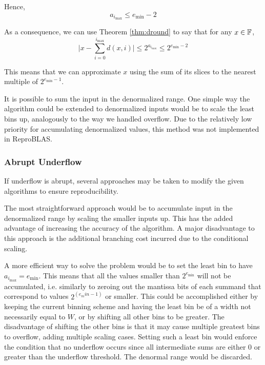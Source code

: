       Hence,
      \[
        a_{i_{\max}} \leq e_{\min} - 2
      \]

      As a consequence, we can use Theorem \ref{thm:dround} to say that for any $x \in \mathbb{F}$,
      \begin{equation}
        \bigl|x - \sum\limits_{i = 0}^{i_{\max}} d(x, i)\bigr| \leq 2^{a_{i_{\max}}} \leq 2^{e_{\min} - 2}
        \label{eq:droundunderflow}
      \end{equation}

      This means that we can approximate $x$ using the sum of its slices to the
      nearest multiple of $2^{e_{\min}-1}$.

      It is possible to sum the input in the denormalized range. One simple way
      the algorithm could be extended to denormalized inputs would be to scale
      the least bins up, analogously to the way we handled overflow. Due to the
      relatively low priority for accumulating denormalized values, this method
      was not implemented in ReproBLAS.

    \subsubsection{Abrupt Underflow}
      \label{sec:indexed_underflow_abrupt}
      If underflow is abrupt, several approaches may be taken to modify the
      given algorithms to ensure reproducibility.

      The most straightforward approach would be to accumulate input in the
      denormalized range by scaling the smaller inputs up. This has the added
      advantage of increasing the accuracy of the algorithm. A major
      disadvantage to this approach is the additional branching cost incurred
      due to the conditional scaling.

      A more efficient way to solve the problem would be to set the least bin
      to have $a_{i_{\max}} = e_{\min}$. This means that all the values smaller
      than $2^{e_{\min}}$ will not be accumulated,
      i.e. similarly to zeroing out the mantissa bits of each summand
      that correspond to values $2^{(e_min-1)}$ or smaller.
      This could be accomplished either
      by keeping the current binning scheme and having the least bin be of a
      width not necessarily equal to $W$, or by shifting all other bins to be
      greater. The disadvantage of shifting the other bins is that it may cause
      multiple greatest bins to overflow, adding multiple scaling cases.
      Setting such a least bin would enforce the condition that no underflow
      occurs since all intermediate sums are either $0$ or greater than the
      underflow threshold. The denormal range would be discarded.

